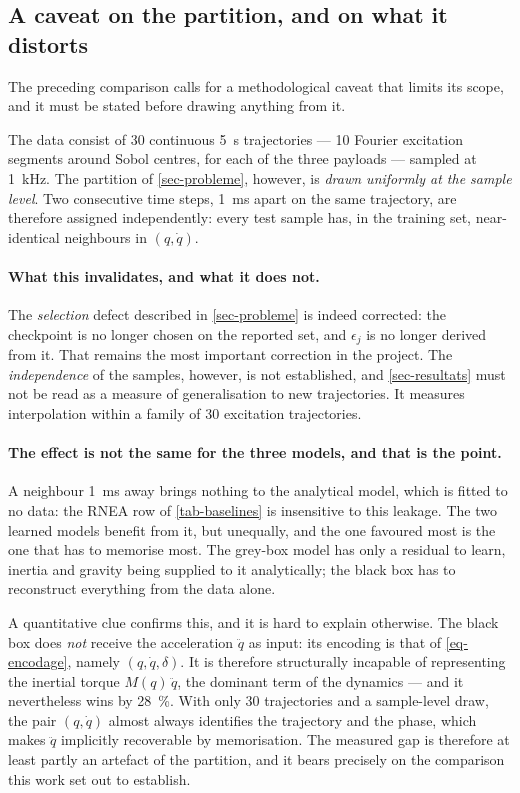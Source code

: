 \documentclass[a4paper, oneside]{article}
\newcommand{\q}{\ensuremath{q}}
\newcommand{\qd}{\ensuremath{\dot{q}}}
\newcommand{\qdd}{\ensuremath{\ddot{q}}}
\begin{document}
\subsection{A caveat on the partition, and on what it distorts}
\label{sec-res-partition}

The preceding comparison calls for a methodological caveat that limits its
scope, and it must be stated before drawing anything from it.

The data consist of \num{30} continuous \SI{5}{\second} trajectories ---
\num{10} Fourier excitation segments around Sobol centres, for each of the
three payloads --- sampled at \SI{1}{\kilo\hertz}. The partition of
\cref{sec-probleme}, however, is \emph{drawn uniformly at the sample level}.
Two consecutive time steps, \SI{1}{\milli\second} apart on the same trajectory,
are therefore assigned independently: every test sample has, in the training
set, near-identical neighbours in $(\q, \qd)$.

\paragraph{What this invalidates, and what it does not.} The \emph{selection}
defect described in \cref{sec-probleme} is indeed corrected: the checkpoint is
no longer chosen on the reported set, and $\epsilon_j$ is no longer derived
from it. That remains the most important correction in the project. The
\emph{independence} of the samples, however, is not established, and
\cref{sec-resultats} must not be read as a measure of generalisation to new
trajectories. It measures interpolation within a family of \num{30} excitation
trajectories.

\paragraph{The effect is not the same for the three models, and that is the
point.} A neighbour \SI{1}{\milli\second} away brings nothing to the analytical
model, which is fitted to no data: the RNEA row of \cref{tab-baselines} is
insensitive to this leakage. The two learned models benefit from it, but
unequally, and the one favoured most is the one that has to memorise most. The
grey-box model has only a residual to learn, inertia and gravity being supplied
to it analytically; the black box has to reconstruct everything from the data
alone.

A quantitative clue confirms this, and it is hard to explain otherwise. The
black box does \emph{not} receive the acceleration $\qdd$ as input: its
encoding is that of \cref{eq-encodage}, namely $(\q, \qd, \delta)$. It is
therefore structurally incapable of representing the inertial torque
$M(\q)\,\qdd$, the dominant term of the dynamics --- and it nevertheless wins
by \SI{28}{\percent}. With only \num{30} trajectories and a sample-level draw,
the pair $(\q, \qd)$ almost always identifies the trajectory and the phase,
which makes $\qdd$ implicitly recoverable by memorisation. The measured gap is
therefore at least partly an artefact of the partition, and it bears precisely
on the comparison this work set out to establish.
\end{document}
